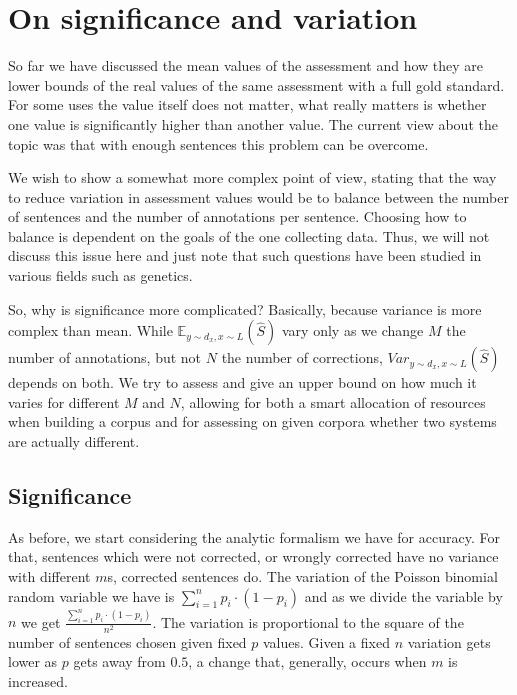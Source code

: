 \documentclass[english]{article}
\begin{document}
\section{On significance and variation}

So far we have discussed the mean values of the assessment and how they are lower bounds of the real values of the same assessment with a full gold standard. For some uses the value itself does not matter, what really matters is whether one value is significantly higher than another value. The current view about the topic was that with enough sentences this problem can be overcome.

We wish to show a somewhat more complex point of view, stating that the way to reduce variation in assessment values would be to balance between the number of sentences and the number of annotations per sentence. Choosing how to balance is dependent on the goals of the one collecting data. Thus, we will not discuss this issue here and just note that such questions have been studied in various fields such as genetics\cite{ionita2010optimal}.

So, why is significance more complicated? Basically, because variance is more complex than mean. While $\mathbb{E}_{y\sim d_x, x\sim L}\left(\hat{S}\right)$ vary only as we change $M$
the number of annotations, but not $N$ the number of corrections,
$Var_{y\sim d_x, x\sim L}(\hat{S})$ depends on both. We try to assess and give an upper
bound on how much it varies for different $M$ and $N$, allowing
for both a smart allocation of resources when building a corpus and
for assessing on given corpora whether two systems are actually different.

\subsection{Significance}

As before, we start considering the analytic formalism we have for accuracy. For that, sentences which were not corrected, or wrongly corrected have no variance with different $m$s, corrected sentences do. The variation of the Poisson binomial random variable we have is $\sum_{i=1}^{n}p_i\cdot\left(1-p_i\right)$ and as we divide the variable by $n$ we get $\frac{\sum_{i=1}^{n}p_i\cdot\left(1-p_i\right)}{n^2}$. 
The variation is proportional to the square of the number of sentences chosen given fixed $p$ values. Given a fixed $n$ variation gets lower as $p$ gets away from $0.5$, a change that, generally, occurs when $m$ is increased.
\end{document}
